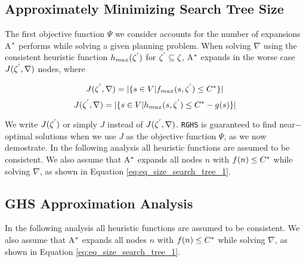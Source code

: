 \subsection{Approximately Minimizing Search Tree Size}
\noindent
The first objective function $\Psi$ we consider accounts for the number of expansions A$\sp{*}$ performs while solving a given planning problem. When solving $\nabla$ using the consistent heuristic function $h_{max}(\zeta\sp{'})$  for $\zeta\sp{'} \subseteq \zeta$, A$\sp{*}$ expands in the worse case $J(\zeta\sp{'},\nabla)$ nodes, where

\begin{equation}
J(\zeta\sp{'},\nabla) = |\{s \in V | f_{max}(s,\zeta\sp{'}) \leq C\sp{*}\}|
\label{eq:eq_size_search_tree_1}
\end{equation}
\begin{equation}
J(\zeta\sp{'},\nabla) = |\{s \in V | h_{max}(s,\zeta\sp{'}) \leq C\sp{*} - g(s)\}|
\label{eq:eq_size_search_tree_2}
\end{equation}

We write $J(\zeta\sp{'})$ or simply $J$ instead of $J(\zeta\sp{'},\nabla)$. \texttt{RGHS} is guaranteed to find near$-$optimal solutions when we use $J$ as the objective function $\Psi$, as we now demostrate. In the following analysis all heuristic functions are assumed to be consistent. We also assume that A$\sp{*}$ expands all nodes $n$ with $f(n) \leq C\sp{*}$ while solving $\nabla$, as shown in Equation \ref{eq:eq_size_search_tree_1}.



\subsection{GHS Approximation Analysis}
In the following analysis all heuristic functions are assumed to be consistent. We also assume that A$\sp{*}$ expands all nodes $n$ with $f(n) \leq C\sp{*}$ while solving $\nabla$, as shown in Equation \eqref{eq:eq_size_search_tree_1}.

